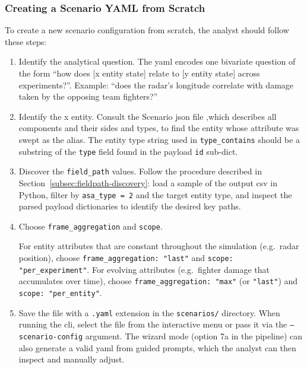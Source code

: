 \subsubsection{Creating a Scenario YAML from Scratch}
\label{subsec:yaml-creation}

To create a new scenario configuration from scratch, the analyst should follow these steps:

\begin{enumerate}
    \item Identify the analytical question.  The \gls{yaml} encodes one bivariate
          question of the form ``how does [x entity state] relate to [y entity state] across
          experiments?''.  Example: ``does the radar's longitude correlate with damage taken
          by the opposing team fighters?''

    \item Identify the x entity.  Consult the Scenario \gls{json} file ,which
          describes all components and their sides and types,
          to find the entity whose attribute was swept as the alias.  The entity type string
          used in \texttt{type\_contains} should be a substring of the \texttt{type} field
          found in the payload \texttt{id} sub-dict.

    \item Discover the \texttt{field\_path} values.  Follow the procedure described
          in Section~\ref{subsec:fieldpath-discovery}: load a sample of the output \gls{csv}
          in Python, filter by \texttt{asa\_type~=~2} and the target entity type, and inspect
          the parsed payload dictionaries to identify the desired key paths.

    \item Choose \texttt{frame\_aggregation} and \texttt{scope}.
          \begin{sloppypar}For entity
          attributes that are constant throughout the simulation (e.g.\ radar position),
          choose \texttt{frame\_aggregation: "last"} and \texttt{scope: "per\_experiment"}.
          For evolving attributes (e.g.\ fighter damage that accumulates over time),
          choose \texttt{frame\_aggregation: "max"} (or \texttt{"last"}) and
          \texttt{scope: "per\_entity"}.\end{sloppypar}

    \item Save the file with a \texttt{.yaml} extension in the \texttt{scenarios/}
          directory.  When running the \gls{cli}, select the file from the interactive menu
          or pass it via the \texttt{--scenario-config} argument.  The wizard mode
          (option 7a in the pipeline) can also generate a valid \gls{yaml} from guided prompts,
          which the analyst can then inspect and manually adjust.
\end{enumerate}

